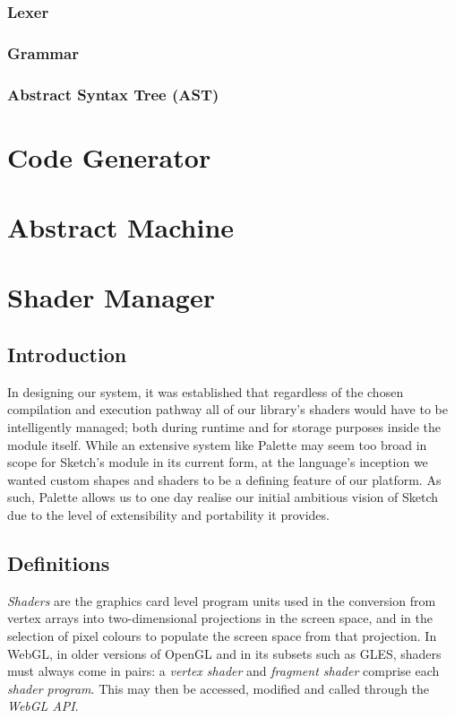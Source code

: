 \documentclass{l3proj}
\begin{document}
\subsubsection{Lexer}
\subsubsection{Grammar}
\subsubsection { Abstract Syntax Tree (AST)}


\section{Code Generator}
\label{arch-gen}

\section{Abstract Machine}
\label{arch-abs}

\section{Shader Manager}
\label{arch-shad}

\subsection{Introduction}
\label{arch-shad-intro}
In designing our system, it was established that regardless of the chosen compilation and execution pathway all of our library's shaders would have to be intelligently managed; both during runtime and for storage purposes inside the module itself. While an extensive system like Palette may seem too broad in scope for Sketch's module in its current form, at the language's inception we wanted custom shapes and shaders to be a defining feature of our platform. As such, Palette allows us to one day realise our initial ambitious vision of Sketch due to the level of extensibility and portability it provides.

\subsection{Definitions}
\label{arch-shad-def}
\textit{Shaders} are the graphics card level program units used in the conversion from vertex arrays into two-dimensional projections in the screen space, and in the selection of pixel colours to populate the screen space from that projection. In WebGL, in older versions of OpenGL and in its subsets such as GLES, shaders must always come in pairs: a \textit{vertex shader} and \textit{fragment shader} comprise each \textit{shader program}. This may then be accessed, modified and called through the \textit{WebGL API}.
\end{document}
